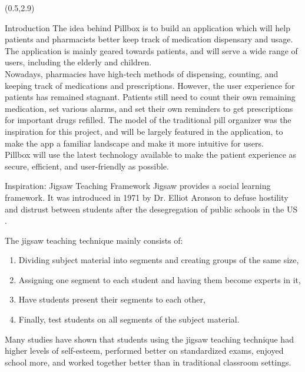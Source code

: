 \documentclass[22pt]{beamer}
\begin{document}
\begin{frame}[fragile]
\begin{textblock}{7.25}(0.5,2.9)

\begin{block}{Introduction}
The idea behind Pillbox is to build an application which will help patients and pharmacists better keep track of medication dispensary and usage. The application is mainly geared towards patients, and will serve a wide range of users, including the elderly and children. \\
Nowadays, pharmacies have high-tech methods of dispensing, counting, and keeping track of medications and prescriptions. However, the user experience for patients has remained stagnant. Patients still need to count their own remaining medication, set various alarms, and set their own reminders to get prescriptions for important drugs refilled. The model of the traditional pill organizer was the inspiration for this project, and will be largely featured in the application, to make the app a familiar landscape and make it more intuitive for users.\\
Pillbox will use the latest technology available to make the patient experience as secure, efficient, and user-friendly as possible.
\end{block}

\begin{block}{Inspiration: Jigsaw Teaching Framework}
Jigsaw provides a social learning framework. It was introduced in 1971 by Dr. Elliot Aronson to defuse hostility and distrust between students after the desegregation of public schools in the US \cite{aronson2002building}.

The jigsaw teaching technique mainly consists of:
\begin{enumerate}
	\item Dividing subject material into segments and creating groups of the same size,
	\item Assigning one segment to each student and having them become experts in it,
	\item Have students present their segments to each other,
	\item Finally, test students on all segments of the subject material.
\end{enumerate}

Many studies have shown that students using the jigsaw teaching technique had higher levels of self-esteem, performed better on standardized exams, enjoyed school more, and worked together better than in traditional classroom settings.


\end{block}
\end{textblock}
\end{frame}
\end{document}
